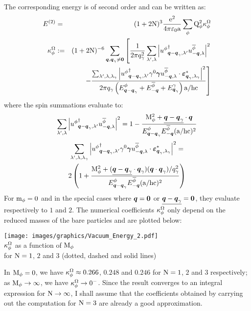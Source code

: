 The corresponding energy is of second order and can be written as:
\begin{eqnarray*}
E^{(2)} & = & ( 1 + 2 \mathrm N )^3 \frac{\mathrm e^2}{4 \pi \mathrm \varepsilon_0 \mathrm a} \sum_{\phi} \mathrm Q_{\phi}^2 \kappa^\Omega_\phi \\
\kappa^\Omega_\phi & := & ( 1 + 2 \mathrm N )^{-6} \sum_{\boldsymbol{q},\boldsymbol{q}_\gamma \neq \boldsymbol{0}} \left[ \frac 1 {2 \pi q_\gamma^2} \sum_{\lambda',\lambda} \left| {u^{\phi}}^{\dagger}_{{\boldsymbol{q} - \boldsymbol{q}_\gamma}, {\lambda'}} u^{\overline{\phi}}_{{-\boldsymbol{q}}, {\lambda}} \right|^2 \right. \\
&& \left. - \frac {\sum_{\lambda',\lambda,\lambda_\gamma} \left| {u^{\phi}}^{\dagger}_{{\boldsymbol{q} - \boldsymbol{q}_\gamma}, {\lambda'}} \gamma^{0} \boldsymbol{\gamma} u^{\overline{\phi}}_{{-\boldsymbol{q}}, {\lambda}} \cdot \boldsymbol{\varepsilon}_{{\boldsymbol{q}_\gamma},{\lambda_\gamma}}^* \right|^2} {2 \pi q_\gamma \left( E^{\phi}_{\boldsymbol{q} - \boldsymbol{q}_\gamma} + E^{\overline{\phi}}_{-\boldsymbol{q}} + E^{\gamma}_{\boldsymbol{q}_\gamma} \right) \mathrm a / \mathrm h \mathrm c} \right]
\end{eqnarray*}
where the spin summations evaluate to:
\begin{equation*}
\sum_{\lambda',\lambda} \left| {u^{\phi}}^{\dagger}_{{\boldsymbol{q} - \boldsymbol{q}_\gamma}, {\lambda'}} u^{\overline{\phi}}_{{-\boldsymbol{q}}, {\lambda}} \right|^2 = 1 - \frac{\mathrm M_{\phi}^2 + \underline{\boldsymbol{q} - \boldsymbol{q}_\gamma} \cdot \boldsymbol{q}}{E^{\phi}_{\boldsymbol{q} - \boldsymbol{q}_\gamma} E^{\overline{\phi}}_{-\boldsymbol{q}} ( \mathrm a / \mathrm h \mathrm c )^2} \\
\end{equation*}
\begin{multline*}
\sum_{\lambda',\lambda,\lambda_\gamma} \left| {u^{\phi}}^{\dagger}_{{\boldsymbol{q} - \boldsymbol{q}_\gamma}, {\lambda'}} \gamma^{0} \boldsymbol{\gamma} u^{\overline{\phi}}_{{-\boldsymbol{q}}, {\lambda}} \cdot \boldsymbol{\varepsilon}_{{\boldsymbol{q}_\gamma},{\lambda_\gamma}}^* \right|^2 = \\
2 \left( 1 + \frac{\mathrm M_{\phi}^2 + ( \underline{\boldsymbol{q} - \boldsymbol{q}_\gamma} \cdot \boldsymbol{q}_\gamma ) ( \boldsymbol{q} \cdot \boldsymbol{q}_\gamma ) / q_\gamma^2}{E^{\phi}_{\boldsymbol{q} - \boldsymbol{q}_\gamma} E^{\overline{\phi}}_{-\boldsymbol{q}} ( \mathrm a / \mathrm h \mathrm c )^2} \right)
\end{multline*}
For $\mathrm m_{\phi} = 0$ and in the special cases where $\boldsymbol{q} = \boldsymbol{0}$ or $\underline{\boldsymbol{q} - \boldsymbol{q}_\gamma} = \boldsymbol{0}$, they evaluate respectively to $1$ and $2$.
The numerical coefficients $\kappa^\Omega_\phi$ only depend on the reduced masses of the bare particles and are plotted below:
\begin{center}
\texttt{[image: images/graphics/Vacuum\_Energy\_2.pdf]}\\
\small{$\kappa^\Omega_\phi$ as a function of $\mathrm M_{\phi}$\\
for $\mathrm N = 1$, $2$ and $3$ (dotted, dashed and solid lines)}
\end{center}
In $\mathrm M_{\phi} = 0$, we have $\kappa^\Omega_\phi \approx 0.266$, $0.248$ and $0.246$ for $\mathrm N = 1$, $2$ and $3$ respectively; as $\mathrm M_{\phi} \to \infty$, we have $\kappa^\Omega_\phi \to 0^-$. Since the result converges to an integral expression for $\mathrm N \to \infty$, I shall assume that the coefficients obtained by carrying out the computation for $\mathrm N = 3$ are already a good approximation.

